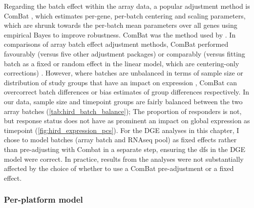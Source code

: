 Regarding the batch effect within the array data, a popular adjustment method is ComBat \autocite{johnson2007AdjustingBatchEffects}, which estimates per-gene, per-batch centering and scaling parameters, which are shrunk towards the per-batch mean parameters over all genes using empirical Bayes to improve robustness.
ComBat was the method used by \textcite{sobolev2016AdjuvantedInfluenzaH1N1Vaccination}.
In comparisons of array batch effect adjustment methods, ComBat performed favourably (versus five other adjustment packages) \autocite{chen2011RemovingBatchEffects} or comparably (versus fitting batch as a fixed or random effect in the linear model, which are centering-only corrections) \autocite{espin-perez2018ComparisonStatisticalMethods}.
However, where batches are unbalanced in terms of sample size \autocite{zhang2018AlternativeEmpiricalBayes} or distribution of study groups that have an impact on expression \autocite{nygaard2015MethodsThatRemove}, ComBat can overcorrect batch differences or bias estimates of group differences respectively.
In our data, sample size and timepoint groups are fairly balanced between the two array batches (\cref{tab:hird_batch_balance});
The proportion of responders is not, but response status does not have as prominent an impact on global expression as timepoint (\cref{fig:hird_expression_pcs}).
For the \gls{DGE} analyses in this chapter, I chose to model batches (array batch and \gls{RNAseq} pool) as fixed effects rather than pre-adjusting with Combat in a separate step, ensuring the \glspl{df} in the \gls{DGE} model were correct.
In practice, results from the analyses were not substantially affected by the choice of whether to use a ComBat pre-adjustment or a fixed effect.
%



\subsubsection{Per-platform  model}

